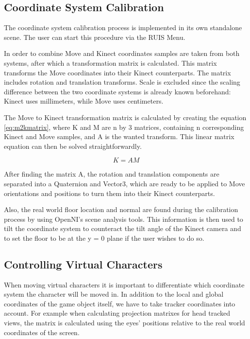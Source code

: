 \documentclass[12pt,a4paper,oneside,pdftex]{report}
\begin{document}
\subsection{Coordinate System Calibration}
\label{subsection:coordinatesystems:calibration}

The coordinate system calibration process is implemented in its own standalone scene. The user can start this procedure via the RUIS Menu. 

In order to combine Move and Kinect coordinates samples are taken from both systems, after which a transformation matrix is calculated. This matrix transforms the Move coordinates into their Kinect counterparts. The matrix includes rotation and translation transforms. Scale is excluded since the scaling difference between the two coordinate systems is already known beforehand: Kinect uses millimeters, while Move uses centimeters.

The Move to Kinect transformation matrix is calculated by creating the equation \ref{eq:m2kmatrix}, where K and M are n by 3 matrices, containing n corresponding Kinect and Move samples, and A is the wanted transform. This linear matrix equation can then be solved straightforwardly.

\begin{equation}
    K = AM
    \label{eq:m2kmatrix}
\end{equation}

After finding the matrix A, the rotation and translation components are separated into a Quaternion and Vector3, which are ready to be applied to Move orientations and positions to turn them into their Kinect counterparts.

Also, the real world floor location and normal are found during the calibration process by using OpenNI's scene analysis tools. This information is then used to tilt the coordinate system to counteract the tilt angle of the Kinect camera and to set the floor to be at the y = 0 plane if the user wishes to do so.

\subsection{Controlling Virtual Characters}
\label{subsection:coordinatesystems:virtualcharacters}

When moving virtual characters it is important to differentiate which coordinate system the character will be moved in. In addition to the local and global coordinates of the game object itself, we have to take tracker coordinates into account. For example when calculating projection matrixes for head tracked views, the matrix is calculated using the eyes' positions relative to the real world coordinates of the screen. 
\end{document}
